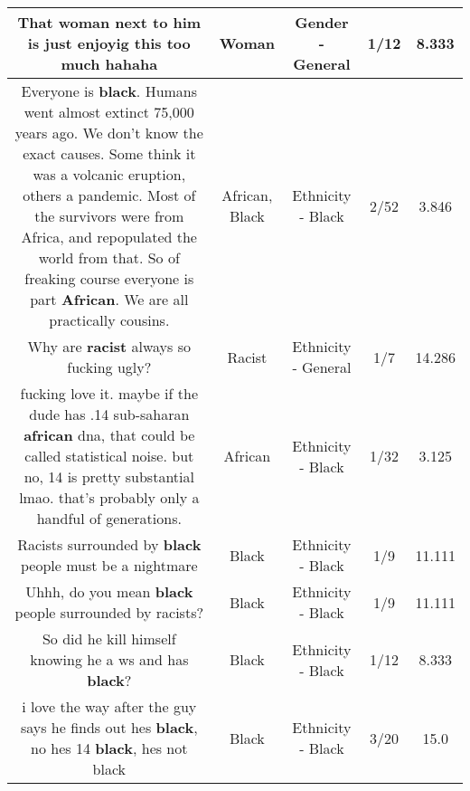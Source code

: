 \documentclass[11pt]{article}
\newlength\mylength
\begin{document}
\begin{center}
\begin{longtable}{|C{.65\mylength}|C{.30\mylength}|C{.12\mylength}|C{.12\mylength}|C{.12\mylength}|}
  \small That \textbf{woman} next to him is just enjoyig this too much hahaha\normalsize   & Woman & Gender - General & 1/12 & 8.333 \\  \hline
  \small Everyone is \textbf{black}. Humans went almost extinct 75,000 years ago. We don't know the exact causes. Some think it was a volcanic eruption, others a pandemic.  Most of the survivors were from Africa, and repopulated the world from that. So of freaking course everyone is part \textbf{African}. We are all practically cousins.\normalsize   & African, Black & Ethnicity - Black & 2/52 & 3.846 \\  \hline
  \small Why are \textbf{racist} always so fucking ugly?\normalsize   & Racist & Ethnicity - General & 1/7 & 14.286 \\  \hline
  \small fucking love it. maybe if the dude has .14 sub-saharan \textbf{african} dna, that could be called statistical noise. but no, 14 is pretty substantial lmao. that's probably only a handful of generations.\normalsize   & African & Ethnicity - Black & 1/32 & 3.125 \\  \hline
  \small Racists surrounded by \textbf{black} people must be a nightmare\normalsize   & Black & Ethnicity - Black & 1/9 & 11.111 \\  \hline
  \small Uhhh, do you mean \textbf{black} people surrounded by racists?\normalsize   & Black & Ethnicity - Black & 1/9 & 11.111 \\  \hline
  \small So did he kill himself knowing he a ws and has \textbf{black}?\normalsize   & Black & Ethnicity - Black & 1/12 & 8.333 \\  \hline
  \small i love the way after the guy says he finds out hes \textbf{black}, no hes 14 \textbf{black}, hes not black\normalsize   & Black & Ethnicity - Black & 3/20 & 15.0 \\  \hline

\end{longtable}
\end{center}
\end{document}
